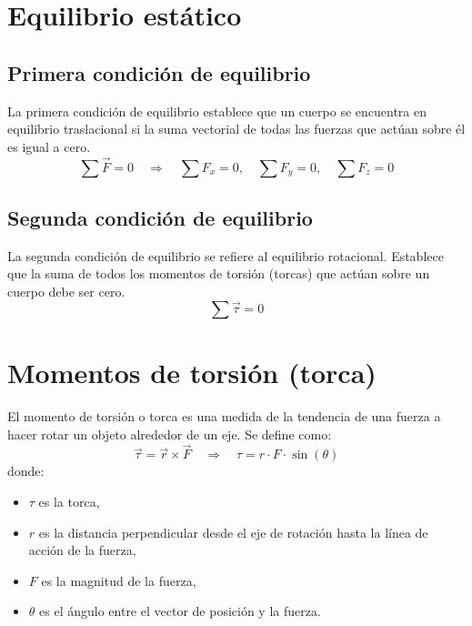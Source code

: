 


\section{Equilibrio estático}

\subsection{Primera condición de equilibrio}
La primera condición de equilibrio establece que un cuerpo se encuentra en equilibrio traslacional si la suma vectorial de todas las fuerzas que actúan sobre él es igual a cero.
\begin{equation}
    \sum \vec{F} = 0 \quad \Rightarrow \quad \sum F_x = 0, \quad \sum F_y = 0, \quad \sum F_z = 0
\end{equation}

\subsection{Segunda condición de equilibrio}
La segunda condición de equilibrio se refiere al equilibrio rotacional. Establece que la suma de todos los momentos de torsión (torcas) que actúan sobre un cuerpo debe ser cero.
\begin{equation}
    \sum \vec{\tau} = 0
\end{equation}

\section{Momentos de torsión (torca)}

El momento de torsión o torca es una medida de la tendencia de una fuerza a hacer rotar un objeto alrededor de un eje. Se define como:
\begin{equation}
    \vec{\tau} = \vec{r} \times \vec{F} \quad \Rightarrow \quad \tau = r \cdot F \cdot \sin(\theta)
\end{equation}
donde:
\begin{itemize}
    \item $ \tau $ es la torca,
    \item $ r $ es la distancia perpendicular desde el eje de rotación hasta la línea de acción de la fuerza,
    \item $ F $ es la magnitud de la fuerza,
    \item $ \theta $ es el ángulo entre el vector de posición y la fuerza.
\end{itemize}

